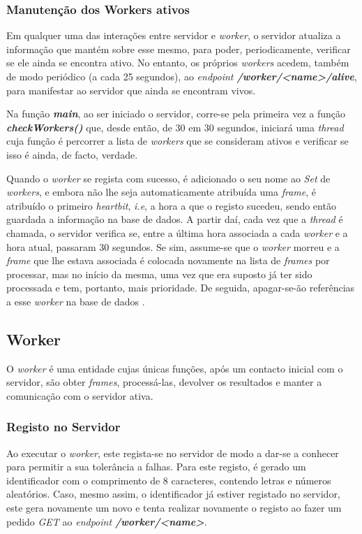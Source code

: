 \documentclass[10pt,portuguese]{article}
\begin{document}
\subsubsection{Manutenção dos Workers ativos}
\par Em qualquer uma das interações entre servidor e \textit{worker}, o servidor atualiza a informação que mantém sobre esse mesmo, para poder, periodicamente, verificar se ele ainda se encontra ativo. No entanto, os próprios \textit{workers} acedem, também de modo periódico (a cada 25 segundos), ao \textit{endpoint \textbf{/worker/<name>/alive}}, para manifestar ao servidor que ainda se encontram vivos. 
\par Na função \textit{\textbf{main}}, ao ser iniciado o servidor, corre-se pela primeira vez a função \textit{\textbf{checkWorkers()}} que, desde então, de 30 em 30 segundos, iniciará uma \textit{thread} cuja função é percorrer a lista de \textit{workers} que se consideram ativos e verificar se isso é ainda, de facto, verdade. 
\par Quando o \textit{worker} se regista com sucesso, é adicionado o seu nome ao \textit{Set} de \textit{workers}, e embora não lhe seja automaticamente atribuída uma \textit{frame}, é atribuído o primeiro \textit{heartbit}, \textit{i.e}, a hora a que o registo sucedeu, sendo então guardada a informação na base de dados. A partir daí, cada vez que a \textit{thread} é chamada, o servidor verifica se, entre a última hora associada a cada \textit{worker} e a hora atual, passaram 30 segundos. Se sim, assume-se que o \textit{worker} morreu e a \textit{frame} que lhe estava associada é colocada novamente na lista de \textit{frames} por processar, mas no início da mesma, uma vez que era suposto já ter sido processada e tem, portanto, mais prioridade. De seguida, apagar-se-ão referências a esse \textit{worker} na base de dados . 

\subsection{Worker}
\par O \textit{worker} é uma entidade cujas únicas funções, após um contacto inicial com o servidor, são obter \textit{frames}, processá-las, devolver os resultados e manter a comunicação com o servidor ativa.

\subsubsection{Registo no Servidor}
\par Ao executar o \textit{worker}, este regista-se no servidor de modo a dar-se a conhecer para permitir a sua tolerância a falhas. Para este registo, é gerado um identificador com o comprimento de 8 caracteres, contendo letras e números aleatórios. Caso, mesmo assim, o identificador já estiver registado no servidor, este gera novamente um novo e tenta realizar novamente o registo ao fazer um pedido \textit{GET} ao \textit{endpoint \textbf{/worker/<name>}}.
\end{document}
